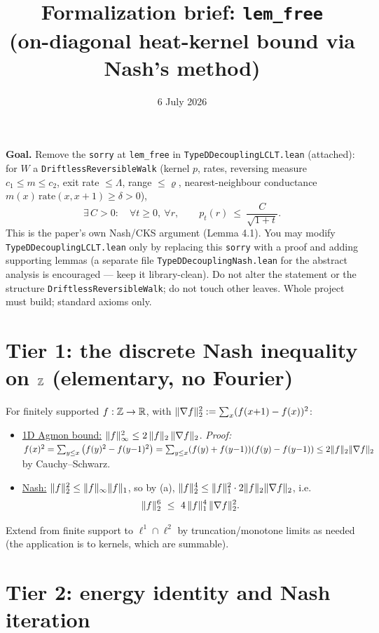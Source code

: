 \documentclass[11pt]{article}
\title{Formalization brief: \texttt{lem\_free}\\
(on-diagonal heat-kernel bound via Nash's method)}
\date{6 July 2026}
\theoremstyle{plain}
\theoremstyle{remark}
\begin{document}
\maketitle

\noindent\textbf{Goal.} Remove the \texttt{sorry} at \texttt{lem\_free} in
\texttt{TypeDDecouplingLCLT.lean} (attached): for
$W$ a \texttt{DriftlessReversibleWalk} (kernel $p$, rates, reversing measure
$c_1\le m\le c_2$, exit rate $\le\Lambda$, range $\le\varrho$, nearest-neighbour
conductance $m(x)\,\mathrm{rate}(x,x{+}1)\ge\delta>0$),
\[
  \exists\,C>0:\quad \forall t\ge0,\ \forall r,\qquad
  p_t(r)\ \le\ \frac C{\sqrt{1+t}} .
\]
This is the paper's own Nash/CKS argument (Lemma 4.1). You may modify
\texttt{TypeDDecouplingLCLT.lean} only by replacing this \texttt{sorry} with a
proof and adding supporting lemmas (a separate file
\texttt{TypeDDecouplingNash.lean} for the abstract analysis is encouraged ---
keep it library-clean). Do not alter the statement or the structure
\texttt{DriftlessReversibleWalk}; do not touch other leaves. Whole project must
build; standard axioms only.

\section*{Tier 1: the discrete Nash inequality on $\mathbb{Z}$ (elementary, no Fourier)}

For finitely supported $f:\mathbb{Z}\to\mathbb{R}$, with
$\lVert \nabla f\rVert_2^2:=\sum_x(f(x{+}1)-f(x))^2$:
\begin{itemize}
\item[(a)] \underline{1D Agmon bound:}
$\lVert f\rVert_\infty^2\le 2\,\lVert f\rVert_2\,\lVert \nabla f\rVert_2$.
\emph{Proof:} $f(x)^2=\sum_{y\le x}\big(f(y)^2-f(y{-}1)^2\big)
=\sum_{y\le x}(f(y)+f(y{-}1))(f(y)-f(y{-}1))
\le2\lVert f\rVert_2\lVert \nabla f\rVert_2$ by Cauchy--Schwarz.
\item[(b)] \underline{Nash:} $\lVert f\rVert_2^2\le\lVert f\rVert_\infty\lVert f\rVert_1$, so by (a),
$\lVert f\rVert_2^4\le\lVert f\rVert_1^2\cdot2\lVert f\rVert_2\lVert \nabla f\rVert_2$, i.e.
\[
  \lVert f\rVert_2^{6}\ \le\ 4\,\lVert f\rVert_1^{4}\,\lVert \nabla f\rVert_2^{2}.
\]
\end{itemize}
Extend from finite support to $\ell^1\cap\ell^2$ by truncation/monotone limits
as needed (the application is to kernels, which are summable).

\section*{Tier 2: energy identity and Nash iteration}
\end{document}
